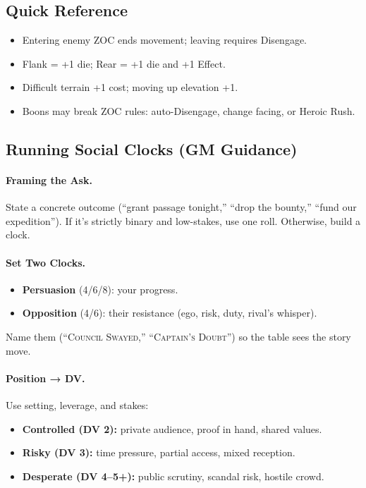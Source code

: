 \subsection{Quick Reference}
\begin{itemize}
  \item Entering enemy ZOC ends movement; leaving requires Disengage.
  \item Flank = +1 die; Rear = +1 die and +1 Effect.
  \item Difficult terrain +1 cost; moving up elevation +1.
  \item Boons may break ZOC rules: auto-Disengage, change facing, or Heroic Rush.
\end{itemize}

\subsection{Running Social Clocks (GM Guidance)}

\paragraph{Framing the Ask.}
State a concrete outcome (“grant passage tonight,” “drop the bounty,” “fund our expedition”). If it’s strictly binary and low-stakes, use one roll. Otherwise, build a clock.

\paragraph{Set Two Clocks.}
\begin{itemize}
  \item \textbf{Persuasion} (4/6/8): your progress.
  \item \textbf{Opposition} (4/6): their resistance (ego, risk, duty, rival’s whisper).
\end{itemize}
Name them (“\textsc{Council Swayed},” “\textsc{Captain’s Doubt}”) so the table sees the story move.

\paragraph{Position → DV.}
Use setting, leverage, and stakes:
\begin{itemize}
  \item \textbf{Controlled (DV 2):} private audience, proof in hand, shared values.
  \item \textbf{Risky (DV 3):} time pressure, partial access, mixed reception.
  \item \textbf{Desperate (DV 4–5+):} public scrutiny, scandal risk, hostile crowd.
\end{itemize}


